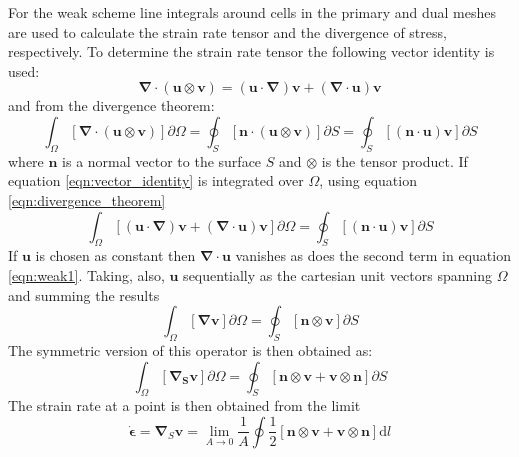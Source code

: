 For the weak scheme line integrals around cells in the primary and dual meshes are used to calculate the strain rate tensor and the divergence of stress, respectively. To determine the strain rate tensor the following vector identity is used:
\begin{equation}
\boldsymbol{\nabla} \cdot (\boldsymbol{u} \otimes \boldsymbol{v}) = (\boldsymbol{u} \cdot \boldsymbol{\nabla}) \boldsymbol{v} + (\boldsymbol{\nabla} \cdot \boldsymbol{u}) \boldsymbol{v}
\label{eqn:vector_identity}
\end{equation}
and from the divergence theorem:
\begin{equation}
\int_\Omega \left[ \boldsymbol{\nabla} \cdot (\boldsymbol{u} \otimes \boldsymbol{v}) \right] \partial{\Omega} = \oint_S \left[\boldsymbol{n} \cdot (\boldsymbol{u} \otimes \boldsymbol{v}) \right] \partial{S} = \oint_S \left[(\boldsymbol{n} \cdot \boldsymbol{u}) \boldsymbol{v} \right] \partial{S}
\label{eqn:divergence_theorem}
\end{equation}
where $\boldsymbol{n}$ is a normal vector to the surface $S$ and $\otimes$ is the tensor product.
If equation \ref{eqn:vector_identity} is integrated over $\Omega$, using equation \ref{eqn:divergence_theorem}
\begin{equation}
\int_\Omega \left[ (\boldsymbol{u} \cdot \boldsymbol{\nabla}) \boldsymbol{v} + (\boldsymbol{\nabla} \cdot \boldsymbol{u}) \boldsymbol{v} \right] \partial{\Omega} = \oint_S \left[(\boldsymbol{n} \cdot \boldsymbol{u}) \boldsymbol{v} \right] \partial{S}
\label{eqn:weak1}
\end{equation}
If $\boldsymbol{u}$ is chosen as constant then $\boldsymbol{\nabla} \cdot \boldsymbol{u}$ vanishes as does the second term in equation \ref{eqn:weak1}. Taking, also, $\boldsymbol{u}$ sequentially as the cartesian unit vectors spanning $\Omega$ and summing the results
\begin{equation}
\int_\Omega \left[ \boldsymbol{\nabla} \boldsymbol{v} \right] \partial{\Omega} = \oint_S \left[ \boldsymbol{n} \otimes \boldsymbol{v} \right] \partial{S}
\end{equation}
The symmetric version of this operator is then obtained as:
\begin{equation}
\int_\Omega \left[ \boldsymbol{\nabla_S} \boldsymbol{v} \right] \partial{\Omega} = \oint_S \left[ \boldsymbol{n} \otimes \boldsymbol{v} + \boldsymbol{v} \otimes \boldsymbol{n} \right] \partial{S}
\end{equation}
The strain rate at a point is then obtained from the limit
\begin{equation}
\boldsymbol{\dot{\epsilon}} = \boldsymbol{\nabla}_S \boldsymbol{v} = \lim_{A \to 0} \frac{1}{A} \oint \frac{1}{2}\left[ \boldsymbol{n} \otimes \boldsymbol{v} + \boldsymbol{v} \otimes \boldsymbol{n} \right] \mathrm{d}l
\end{equation}
